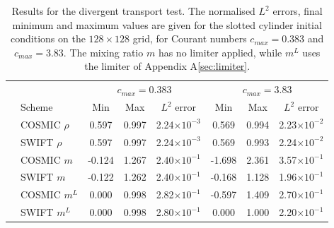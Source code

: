 \documentclass{ametsocV6.1}
\begin{document}
\begin{table}[h!]
\small
\begin{center}
\begin{tabular}{| c | l | c c c | c c c |} \hline
  &  & \multicolumn{3}{c|}{$c_{max}=0.383$} & \multicolumn{3}{c|}{$c_{max}=3.83$} \\
  & Scheme &  Min & Max & $L^2$ error & Min & Max & $L^2$ error   \\ \hline
  \parbox[t]{2mm}{}
  & COSMIC $\rho$ & 0.597 & 0.997 & 2.24$\times 10^{-3}$ & 0.569 & 0.994 & 2.23$\times 10^{-2}$ \\
  & SWIFT $\rho$ & 0.597 & 0.997 & 2.24$\times 10^{-3}$ & 0.569 & 0.993 & 2.24$\times 10^{-2}$ \\
  & COSMIC $m$ & -0.124 & 1.267 & 2.40$\times 10^{-1}$ & -1.698 & 2.361 & 3.57$\times 10^{-1}$ \\
  & SWIFT $m$ & -0.122 & 1.262 & 2.40$\times 10^{-1}$ & -0.168 & 1.128 & 1.96$\times 10^{-1}$ \\
  & COSMIC $m^L$ & 0.000 & 0.998 & 2.82$\times 10^{-1}$ & -0.597 & 1.409 & 2.70$\times 10^{-1}$ \\
  & SWIFT $m^L$ & 0.000 & 0.998 & 2.80$\times 10^{-1}$ & 0.000 & 1.000 & 2.20$\times 10^{-1}$ \\ \hline
\end{tabular}
\caption{Results for the divergent transport test. The normalised $L^2$ errors, final minimum and maximum values are given for the slotted cylinder initial conditions on the $128\times128$ grid, for Courant numbers $c_{max}=0.383$ and $c_{max}=3.83$.
The mixing ratio $m$ has no limiter applied, while $m^L$ uses the limiter of Appendix A\ref{sec:limiter}.}
\label{table:test3}
\end{center}
\end{table}
\end{document}
